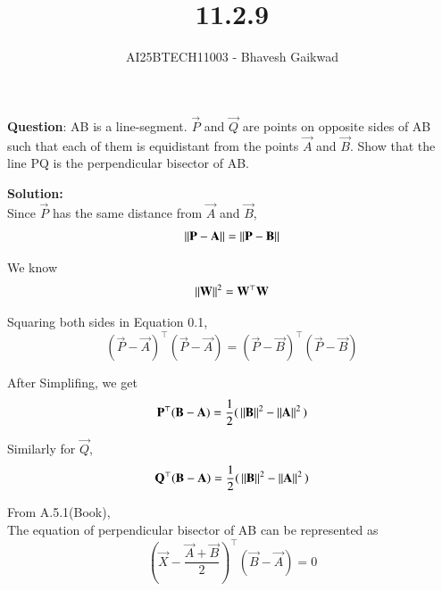 \documentclass[journal]{IEEEtran}
\begin{document}

\vspace{3cm}

\title{11.2.9}
\author{AI25BTECH11003 - Bhavesh Gaikwad}
{\let\newpage\relax\maketitle}

\renewcommand{\thefigure}{\theenumi}
\renewcommand{\thetable}{\theenumi}
\setlength{\intextsep}{10pt} 

\renewcommand{\thetable}{\theenumi}


\textbf{Question}: AB is a line-segment. $\vec{P}$ and $\vec{Q}$ are points on opposite sides of AB such that each of them is equidistant from the points $\vec{A}$ and $\vec{B}$. Show that the line PQ is the
perpendicular bisector of AB.

\bigskip
 
\textbf{Solution:}\\
Since $\vec{P}$ has the same distance from $\vec{A}$ and $\vec{B}$,
\begin{equation}
    \left\lVert\mathbf{P}-\mathbf{A}\right\rVert = \left\lVert\mathbf{P}-\mathbf{B}\right\rVert
\end{equation}

We know
\begin{equation}
 \left\lVert\mathbf{W}\right\rVert^2 = {\mathbf{W}^\top\mathbf{W}}   
\end{equation}

Squaring both sides in Equation 0.1,
\begin{equation}
(\vec{P}-\vec{A})^\top(\vec{P}-\vec{A}) = (\vec{P}-\vec{B})^\top(\vec{P}-\vec{B})
\end{equation}

After Simplifing, we get
\begin{equation}
    \mathbf{P}^\top(\mathbf{B}-\mathbf{A}) = \dfrac{1}{2}(\, \left\lVert\mathbf{B}\right\rVert^2 - \left\lVert\mathbf{A}\right\rVert^2 \,)
\end{equation}

Similarly for $\vec{Q}$,
\begin{equation}
     \mathbf{Q}^\top(\mathbf{B}-\mathbf{A}) = \dfrac{1}{2}(\, \left\lVert\mathbf{B}\right\rVert^2 - \left\lVert\mathbf{A}\right\rVert^2 \,)
\end{equation}

From A.5.1(Book),\\
The equation of perpendicular bisector of AB can be represented as
\begin{equation}
    \left( \vec{X} - \dfrac{\vec{A}+\vec{B}}{2} \right)^\top(\vec{B}-\vec{A}) = 0
\end{equation}
\end{document}

